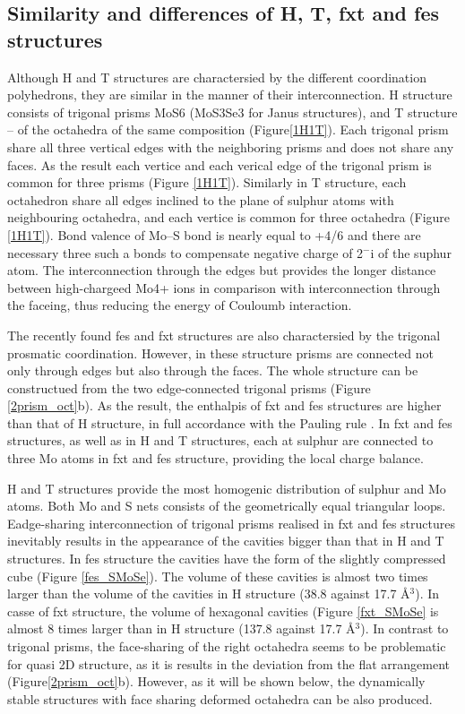 \documentclass[a4paperm]{article}
\begin{document}
\subsection{Similarity and differences of H, T, fxt and fes structures}

Although H and T structures are charactersied by the different coordination polyhedrons, they are similar in the manner of their interconnection.
H structure consists of trigonal prisms MoS6 (MoS3Se3 for Janus structures), and T structure – of the octahedra of the same composition (Figure\ref{1H1T}).
Each trigonal prism share all three vertical edges with the neighboring prisms and does not share any faces.
As the result each vertice and each verical edge of the trigonal prism is common for three prisms (Figure \ref{1H1T}).
Similarly in T structure, each octahedron share all edges inclined to the plane of sulphur atoms with neighbouring octahedra, and each vertice is common for three octahedra (Figure \ref{1H1T}).
Bond valence of Mo--S bond is nearly equal to +4/6 and there are necessary three such a bonds to compensate negative charge of 2$^-$i of the suphur atom.
The interconnection through the edges but provides the longer distance between high-chargeed Mo4+ ions in comparison with interconnection through the faceing, thus reducing the energy of Couloumb interaction.

The recently found fes and fxt structures are also charactersied by the trigonal prosmatic coordination.
However, in these structure prisms are connected not only through edges but also through the faces.
The whole structure can be constructued from the two edge-connected trigonal prisms (Figure \ref{2prism_oct}b).
As the result, the enthalpis of fxt and fes structures are higher than that of H structure, in full accordance with the Pauling rule \cite{Pauling1929}.
In fxt and fes structures, as well as in H and T structures, each at sulphur are connected to three Mo atoms in fxt and fes structure, providing the local charge balance.

H and T structures provide the most homogenic distribution of sulphur and Mo atoms. 
Both Mo and S nets consists of the geometrically equal triangular loops.
Eadge-sharing interconnection of trigonal prisms realised in fxt and fes structures inevitably results in the appearance of the cavities bigger than that in H and T structures. 
In fes structure the cavities have the form of the slightly compressed cube (Figure \ref{fes_SMoSe}).
The volume of these cavities is almost two times larger than the volume of the cavities in H structure (38.8 against 17.7 \AA$^3$).
In casse of fxt structure, the volume of hexagonal cavities (Figure \ref{fxt_SMoSe} is almost 8 times larger than in H structure (137.8 against 17.7 \AA$^3$).
In contrast to trigonal prisms, the face-sharing of the right octahedra seems to be problematic for quasi 2D structure, as it is results in the deviation from the flat arrangement (Figure\ref{2prism_oct}b).
However, as it will be shown below, the dynamically stable structures with face sharing deformed octahedra can be also produced. 
\end{document}
